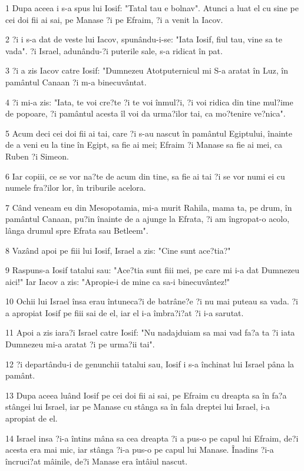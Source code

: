 \par 1 Dupa aceea i s-a spus lui Iosif: "Tatal tau e bolnav". Atunci a luat el cu sine pe cei doi fii ai sai, pe Manase ?i pe Efraim, ?i a venit la Iacov.
\par 2 ?i i s-a dat de veste lui Iacov, spunându-i-se: "Iata Iosif, fiul tau, vine sa te vada". ?i Israel, adunându-?i puterile sale, s-a ridicat în pat.
\par 3 ?i a zis Iacov catre Iosif: "Dumnezeu Atotputernicul mi S-a aratat în Luz, în pamântul Canaan ?i m-a binecuvântat.
\par 4 ?i mi-a zis: "Iata, te voi cre?te ?i te voi înmul?i, ?i voi ridica din tine mul?ime de popoare, ?i pamântul acesta îl voi da urma?ilor tai, ca mo?tenire ve?nica".
\par 5 Acum deci cei doi fii ai tai, care ?i s-au nascut în pamântul Egiptului, înainte de a veni eu la tine în Egipt, sa fie ai mei; Efraim ?i Manase sa fie ai mei, ca Ruben ?i Simeon.
\par 6 Iar copiii, ce se vor na?te de acum din tine, sa fie ai tai ?i se vor numi ei cu numele fra?ilor lor, în triburile acelora.
\par 7 Când veneam eu din Mesopotamia, mi-a murit Rahila, mama ta, pe drum, în pamântul Canaan, pu?in înainte de a ajunge la Efrata, ?i am îngropat-o acolo, lânga drumul spre Efrata sau Betleem".
\par 8 Vazând apoi pe fiii lui Iosif, Israel a zis: "Cine sunt ace?tia?"
\par 9 Raspuns-a Iosif tatalui sau: "Ace?tia sunt fiii mei, pe care mi i-a dat Dumnezeu aici!" Iar Iacov a zis: "Apropie-i de mine ca sa-i binecuvântez!"
\par 10 Ochii lui Israel însa erau întuneca?i de batrâne?e ?i nu mai puteau sa vada. ?i a apropiat Iosif pe fiii sai de el, iar el i-a îmbra?i?at ?i i-a sarutat.
\par 11 Apoi a zis iara?i Israel catre Iosif: "Nu nadajduiam sa mai vad fa?a ta ?i iata Dumnezeu mi-a aratat ?i pe urma?ii tai".
\par 12 ?i departându-i de genunchii tatalui sau, Iosif i s-a închinat lui Israel pâna la pamânt.
\par 13 Dupa aceea luând Iosif pe cei doi fii ai sai, pe Efraim cu dreapta sa în fa?a stângei lui Israel, iar pe Manase cu stânga sa în fala dreptei lui Israel, i-a apropiat de el.
\par 14 Israel insa ?i-a întins mâna sa cea dreapta ?i a pus-o pe capul lui Efraim, de?i acesta era mai mic, iar stânga ?i-a pus-o pe capul lui Manase. Înadins ?i-a încruci?at mâinile, de?i Manase era întâiul nascut.
